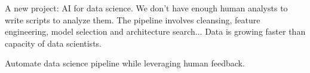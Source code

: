 %

A new project: AI for data science.  We don't have enough human analysts  to write scripts to analyze them. The pipeline involves cleansing, feature engineering, model selection and architecture search... Data is growing faster than capacity of data scientists. 

Automate data science pipeline while leveraging human feedback. 

